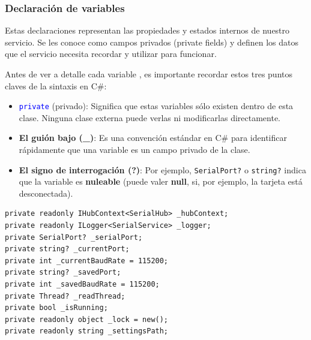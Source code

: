 \documentclass[
10pt, %
a4paper, %
oneside, %
headinclude,footinclude, %
BCOR5mm, %
]{scrartcl}
\begin{document}
\subsubsection{Declaración de variables}
Estas declaraciones representan las propiedades y estados internos de nuestro servicio. Se les conoce como campos privados (private fields) y definen los datos que el servicio necesita recordar y utilizar para funcionar.

Antes de ver a detalle cada variable , es importante recordar estos tres puntos claves de la sintaxis en C\#:

\begin{itemize}
	\item \texttt{\textcolor{blue}{private}} (privado): Significa que estas variables sólo existen dentro de esta clase. Ninguna clase externa puede verlas ni modificarlas directamente.
	\item \textbf{El guión bajo (\_)}: Es una convención estándar en C\# para identificar rápidamente que una variable es un campo privado de la clase.
	\item \textbf{El signo de interrogación (?)}: Por ejemplo, \texttt{SerialPort?} o \texttt{string?} indica que la variable es \textbf{nuleable} (puede valer \textbf{null}, si, por ejemplo, la tarjeta está desconectada).
\end{itemize}

\begin{lstlisting}[style=VSCodeDark]
private readonly IHubContext<SerialHub> _hubContext;
private readonly ILogger<SerialService> _logger;
private SerialPort? _serialPort;
private string? _currentPort;
private int _currentBaudRate = 115200;
private string? _savedPort;
private int _savedBaudRate = 115200;
private Thread? _readThread;
private bool _isRunning;
private readonly object _lock = new();
private readonly string _settingsPath;
\end{lstlisting}
\end{document}

